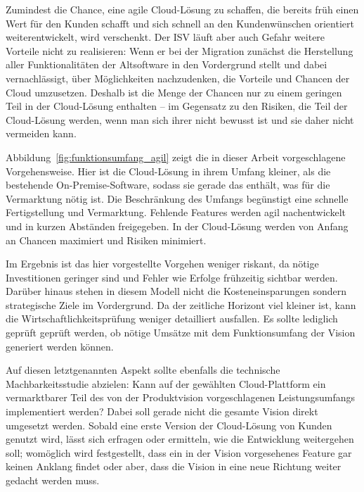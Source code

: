 Zumindest die Chance, eine agile Cloud-Lösung zu schaffen, die 
bereits früh einen Wert für den Kunden schafft und sich schnell an den 
Kundenwünschen orientiert weiterentwickelt, wird verschenkt. Der ISV 
läuft aber auch Gefahr weitere Vorteile nicht zu realisieren: Wenn er bei der 
Migration zunächst die Herstellung aller Funktionalitäten der Altsoftware in 
den Vordergrund stellt und dabei vernachlässigt, über Möglichkeiten 
nachzudenken, die Vorteile und Chancen der Cloud umzusetzen. Deshalb ist die 
Menge der Chancen nur zu einem geringen Teil in der Cloud-Lösung enthalten -- 
im Gegensatz zu den Risiken, die Teil der Cloud-Lösung werden, wenn man sich 
ihrer nicht bewusst ist und sie daher nicht vermeiden kann.


Abbildung~\ref{fig:funktionsumfang_agil} zeigt die in dieser Arbeit 
vorgeschlagene Vorgehensweise. Hier ist die Cloud-Lösung in ihrem Umfang kleiner, 
als die bestehende On-Premise-Software, sodass sie gerade das 
enthält, was für die Vermarktung nötig ist. Die Beschränkung des Umfangs 
begünstigt eine schnelle Fertigstellung und Vermarktung. Fehlende Features 
werden agil nachentwickelt und in kurzen Abständen freigegeben. In der 
Cloud-Lösung werden von Anfang an Chancen maximiert und Risiken minimiert.

Im Ergebnis ist das hier vorgestellte Vorgehen weniger riskant, da nötige 
Investitionen geringer sind und Fehler wie Erfolge frühzeitig sichtbar werden. 
Darüber hinaus stehen in diesem Modell nicht die Kosteneinsparungen sondern strategische 
Ziele im Vordergrund. Da der zeitliche Horizont viel kleiner ist, kann 
die Wirtschaftlichkeitsprüfung weniger detailliert ausfallen. Es sollte 
lediglich geprüft geprüft werden, ob nötige Umsätze mit dem Funktionsumfang der 
Vision generiert werden können. 

Auf diesen letztgenannten Aspekt sollte ebenfalls die technische 
Machbarkeitsstudie abzielen: Kann auf der gewählten Cloud-Plattform ein vermarktbarer Teil des 
von der Produktvision vorgeschlagenen Leistungsumfangs implementiert werden? Dabei soll 
gerade nicht die gesamte Vision direkt umgesetzt werden. Sobald eine 
erste Version der Cloud-Lösung von Kunden genutzt wird, lässt sich erfragen 
oder ermitteln, wie die Entwicklung weitergehen soll; womöglich wird 
festgestellt, dass ein in der Vision vorgesehenes Feature gar keinen Anklang 
findet oder aber, dass die Vision in eine neue Richtung weiter gedacht werden 
muss.


